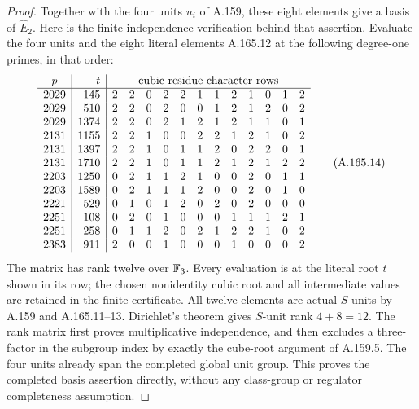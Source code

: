 \begin{proof}
Together with the four units \(u_i\) of A.159, these eight elements
give a basis of \(\widehat E_2\).
Here is the finite independence verification behind that assertion.
Evaluate the four units and the eight literal elements A.165.12 at
the following degree-one primes, in that order:
\[
\begin{array}{c|r|rrrrrrrrrrrr}
p&t&\multicolumn{12}{c}{\text{cubic residue character rows}}\\ \hline
2029&145&2&2&0&2&2&1&1&2&1&0&1&2\\
2029&510&2&2&0&2&0&0&1&2&1&2&0&2\\
2029&1374&2&2&0&2&1&2&1&2&1&1&0&1\\
2131&1155&2&2&1&0&0&2&2&1&2&1&0&2\\
2131&1397&2&2&1&0&1&1&2&0&2&2&0&1\\
2131&1710&2&2&1&0&1&1&2&1&2&1&2&2\\
2203&1250&0&2&1&1&2&1&0&0&2&0&1&1\\
2203&1589&0&2&1&1&1&2&0&0&2&0&1&0\\
2221&529&0&1&0&1&2&0&2&0&2&0&0&0\\
2251&108&0&2&0&1&0&0&0&1&1&1&2&1\\
2251&258&0&1&1&2&0&2&1&2&2&1&0&2\\
2383&911&2&0&0&1&0&0&0&1&0&0&0&2
\end{array}
\tag{A.165.14}
\]
The matrix has rank twelve over \(\mathbb F_3\).  Every evaluation is at the
literal root \(t\) shown in its row; the chosen nonidentity cubic root
and all intermediate values are retained in the finite certificate.
All twelve elements are actual \(S\)-units by A.159 and
A.165.11--13.
Dirichlet's theorem gives \(S\)-unit rank \(4+8=12\).
The rank matrix first proves multiplicative independence, and then
excludes a three-factor in the subgroup index by exactly the cube-root
argument of A.159.5.  The four units already span the completed global
unit group.  This proves the completed basis assertion directly,
without any class-group or regulator completeness assumption.


\end{proof}
